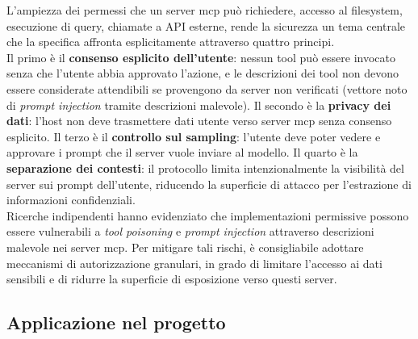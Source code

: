 L'ampiezza dei permessi che un server \gls{mcp} può richiedere, accesso al filesystem,
esecuzione di query, chiamate a API esterne, rende la sicurezza un tema centrale che
la specifica affronta esplicitamente attraverso quattro principi.\\
Il primo è il \textbf{consenso esplicito dell'utente}: nessun tool può essere invocato
senza che l'utente abbia approvato l'azione, e le descrizioni dei tool non devono essere
considerate attendibili se provengono da server non verificati (vettore noto di
\emph{prompt injection} tramite descrizioni malevole). Il secondo è la \textbf{privacy dei
dati}: l'host non deve trasmettere dati utente verso server \gls{mcp} senza consenso esplicito.
Il terzo è il \textbf{controllo sul sampling}: l'utente deve poter vedere e approvare i
prompt che il server vuole inviare al modello. Il quarto è la \textbf{separazione dei
contesti}: il protocollo limita intenzionalmente la visibilità del server sui prompt
dell'utente, riducendo la superficie di attacco per l'estrazione di informazioni
confidenziali.\\
Ricerche indipendenti hanno evidenziato che implementazioni permissive possono essere
vulnerabili a \emph{tool poisoning} e \emph{prompt injection} attraverso descrizioni
malevole nei server \gls{mcp}. Per mitigare tali rischi, è consigliabile adottare meccanismi di autorizzazione granulari, 
in grado di limitare l’accesso ai dati sensibili e di ridurre la superficie di esposizione verso questi server.

\subsection{Applicazione nel progetto}

